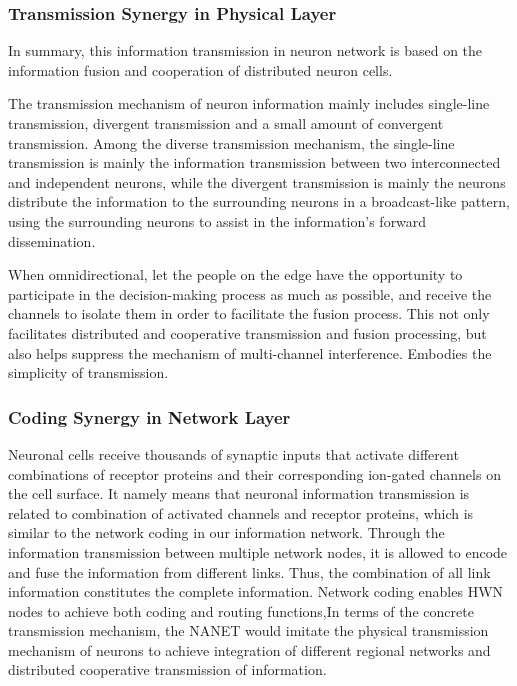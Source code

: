\documentclass[journal,comsoc]{IEEEtran}
\begin{document}
			\subsubsection{Transmission Synergy in Physical Layer}
				In summary, this information transmission in neuron network is based on the information fusion and cooperation of distributed neuron cells.
				
				The transmission mechanism of neuron information mainly includes single-line transmission, divergent transmission and a small amount of convergent transmission.
				Among the diverse transmission mechanism, the single-line transmission is mainly the information transmission between two interconnected and independent neurons, while the divergent transmission is mainly the neurons distribute the information to the surrounding neurons in a broadcast-like pattern, using the surrounding neurons to assist in the information's forward dissemination.
				
					When omnidirectional, let the people on the edge have the opportunity to participate in the decision-making process as much as possible, and receive the channels to isolate them in order to facilitate the fusion process.
				This not only facilitates distributed and cooperative transmission and fusion processing, but also helps suppress the mechanism of multi-channel interference.
				Embodies the simplicity of transmission.
			\subsubsection{Coding Synergy in Network Layer}
				Neuronal cells receive thousands of synaptic inputs that activate different combinations of receptor proteins and their corresponding ion-gated channels on the cell surface.
				It namely means that neuronal information transmission is related to combination of activated channels and receptor proteins, which is similar to the network coding in our information network. 
				Through the information transmission between multiple network nodes, it is allowed to encode and fuse the information from different links. 
				Thus, the combination of all link information constitutes the complete information.
				Network coding enables HWN nodes to achieve both coding and routing functions,In terms of the concrete transmission mechanism, the NANET would imitate the physical transmission mechanism of neurons 
				to achieve integration of different regional networks and distributed cooperative transmission of information.
				
\end{document}

